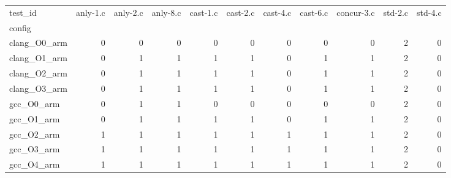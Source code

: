 \begin{tabular}{lrrrrrrrrrr}
\toprule
test_id & anly-1.c & anly-2.c & anly-8.c & cast-1.c & cast-2.c & cast-4.c & cast-6.c & concur-3.c & std-2.c & std-4.c \\
config &  &  &  &  &  &  &  &  &  &  \\
\midrule
clang_O0_arm & 0 & 0 & 0 & 0 & 0 & 0 & 0 & 0 & 2 & 0 \\
clang_O1_arm & 0 & 1 & 1 & 1 & 1 & 0 & 1 & 1 & 2 & 0 \\
clang_O2_arm & 0 & 1 & 1 & 1 & 1 & 0 & 1 & 1 & 2 & 0 \\
clang_O3_arm & 0 & 1 & 1 & 1 & 1 & 0 & 1 & 1 & 2 & 0 \\
gcc_O0_arm & 0 & 1 & 1 & 0 & 0 & 0 & 0 & 0 & 2 & 0 \\
gcc_O1_arm & 0 & 1 & 1 & 1 & 1 & 0 & 1 & 1 & 2 & 0 \\
gcc_O2_arm & 1 & 1 & 1 & 1 & 1 & 1 & 1 & 1 & 2 & 0 \\
gcc_O3_arm & 1 & 1 & 1 & 1 & 1 & 1 & 1 & 1 & 2 & 0 \\
gcc_O4_arm & 1 & 1 & 1 & 1 & 1 & 1 & 1 & 1 & 2 & 0 \\
\bottomrule
\end{tabular}
